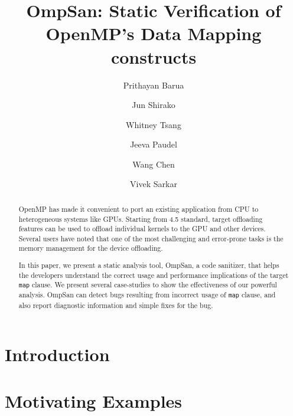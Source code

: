 \documentclass[runningheads]{llncs}
\begin{document}

%
\title{OmpSan: Static Verification of OpenMP's Data Mapping constructs}
%
%
\author{Prithayan Barua \and
Jun Shirako \and
Whitney Tsang \and
Jeeva Paudel \and
Wang Chen \and
Vivek Sarkar
}
%
%

\maketitle              %
%
\begin{abstract}
OpenMP has made it convenient to port an existing application from CPU to heterogeneous systems like GPUs. Starting from 4.5 standard, target offloading features can be used to offload individual kernels to the GPU and other devices. 
Several users have noted that one of the most challenging and error-prone tasks is the memory management for the device offloading. 

In this paper, we present a static analysis tool, 
OmpSan, a code sanitizer, that helps the developers understand the 
correct usage and performance implications of
the target \texttt{map} clause. We present several 
case-studies to show the effectiveness of our powerful analysis.
OmpSan can detect bugs resulting from incorrect usage of 
\texttt{map} clause, and also report diagnostic information
 and simple fixes for the bug.


\end{abstract}
%
%
%
\section{Introduction}
\label{s1}


\section{Motivating Examples}
\label{s2}

\end{document}
